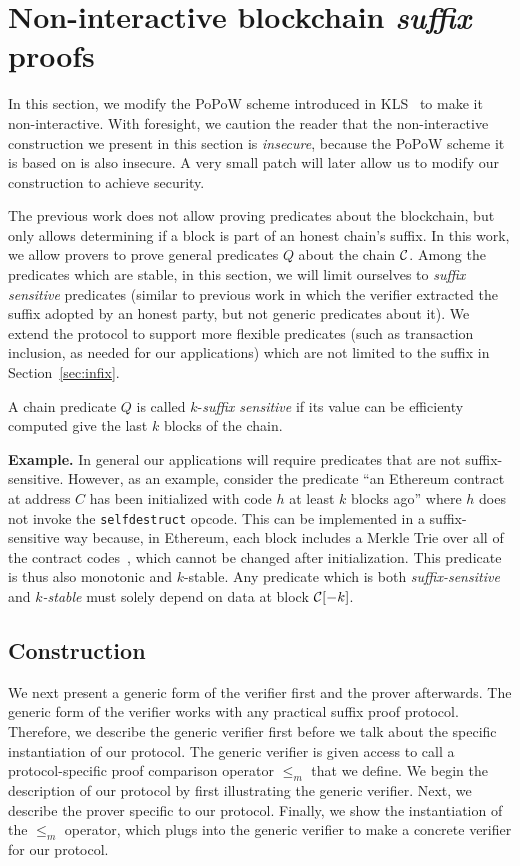 \section{Non-interactive blockchain \emph{suffix} proofs}
In this section, we modify the PoPoW scheme introduced in KLS~\cite{KLS} to make
it non-interactive. With foresight, we caution the reader that the
non-interactive construction we present in this section is \emph{insecure},
because the PoPoW scheme it is based on is also insecure. A very small patch
will later allow us to modify our construction to achieve security.

The previous work does not allow proving predicates about the blockchain, but
only allows determining if a block is part of an honest chain's suffix. In this
work, we allow provers to prove general predicates $Q$ about the chain $\mathcal{C}$.
Among the predicates which are stable, in this section, we will limit ourselves
to \textit{suffix sensitive} predicates (similar to previous work in which the
verifier extracted the suffix adopted by an honest party, but not generic
predicates about it). We extend the protocol to support more flexible predicates
(such as transaction inclusion, as needed for our applications) which are not
limited to the suffix in Section~\ref{sec:infix}.

\begin{definition}
A chain predicate $Q$ is called $k$-\emph{suffix sensitive} if its value
can be efficienty computed give the last $k$ blocks of the chain.
\end{definition}

\noindent\textbf{Example.}
In general our applications will require predicates that are not
suffix-sensitive. However, as an example, consider the predicate ``an Ethereum
contract at address $C$ has been initialized with code $h$ at least $k$ blocks
ago'' where $h$ does not invoke the \texttt{selfdestruct} opcode. This can be
implemented in a suffix-sensitive way because, in Ethereum, each block includes
a Merkle Trie over all of the contract codes~\cite{vitalik,wood}, which cannot be
changed after initialization. This predicate is thus also monotonic and
$k$-stable. Any predicate which is both \emph{suffix-sensitive} and
\emph{$k$-stable} must solely depend on data at block $\mathcal{C}[-k]$.

\subsection{Construction}
We next present a generic form of the verifier first and the prover afterwards.
The generic form of the verifier works with any practical suffix proof protocol.
Therefore, we describe the generic verifier first before we talk about the
specific instantiation of our protocol. The generic verifier is given access to
call a protocol-specific proof comparison operator $\leq_m$ that we define. We
begin the description of our protocol by first illustrating the generic
verifier. Next, we describe the prover specific to our protocol. Finally, we
show the instantiation of the $\leq_m$ operator, which plugs into the generic
verifier to make a concrete verifier for our protocol.

